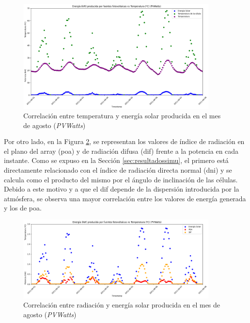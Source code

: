 \vspace{3mm}

\begin{figure}[H]
  \centering
  \includegraphics[width=0.9\textwidth]{img/diseno/energiavstempcel.png}
  \caption{Correlación entre temperatura y energía solar producida en el mes de agosto (\textit{PVWatts})}
  \label{fig:energiavstempcel}
\end{figure}

Por otro lado, en la Figura \ref{fig:energiavsrad}, se representan los valores de índice de radiación en el plano del array (\gls{poa}) y de radiación difusa (\gls{dif}) frente a la potencia en cada instante. Como se expuso en la Sección \ref{sec:resultadossimu}, el primero está directamente relacionado con el índice de radiación directa normal (\gls{dni}) y se calcula como el producto del mismo por el ángulo de inclinación de las células. Debido a este motivo y a que el \gls{dif} depende de la dispersión introducida por la atmósfera, se observa una mayor correlación entre los valores de energía generada y los de \gls{poa}.

\vspace{3mm}

\begin{figure}[H]
  \centering
  \includegraphics[width=0.9\textwidth]{img/diseno/energiavsrad.png}
  \caption{Correlación entre radiación y energía solar producida en el mes de agosto (\textit{PVWatts})}
  \label{fig:energiavsrad}
\end{figure}

